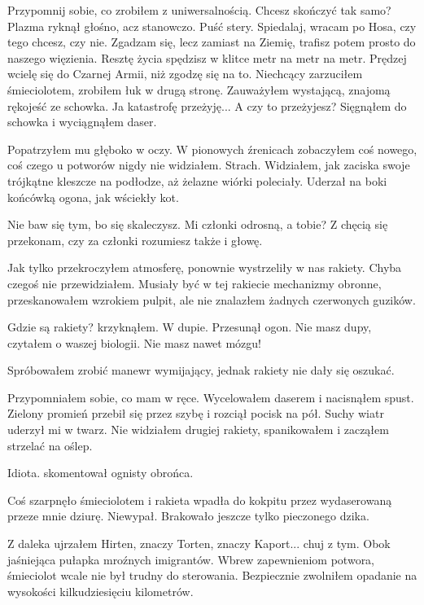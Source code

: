 \begin{dialogue}
\ds{} Przypomnij sobie, co zrobiłem z uniwersalnością. Chcesz skończyć tak samo? \dm{} Plazma ryknął głośno, acz stanowczo. \dm{} Puść stery.
\ds{} Spiedalaj, wracam po Hosa, czy tego chcesz, czy nie.
\ds{} Zgadzam się, lecz zamiast na Ziemię, trafisz potem prosto do naszego więzienia. Resztę życia spędzisz w klitce metr na metr na metr.
\ds{} Prędzej wcielę się do Czarnej Armii, niż zgodzę się na to. \dm{} Niechcący zarzuciłem śmieciolotem, zrobiłem łuk w drugą stronę. Zauważyłem wystającą, znajomą rękojeść ze schowka.
\ds{} Ja katastrofę przeżyję...
\ds{} A czy to przeżyjesz? \dm{} Sięgnąłem do schowka i wyciągnąłem daser. 
\end{dialogue}
Popatrzyłem mu głęboko w oczy. W pionowych źrenicach zobaczyłem coś nowego, coś czego u potworów nigdy nie widziałem. Strach.
Widziałem, jak zaciska swoje trójkątne kleszcze na podłodze, aż żelazne wiórki poleciały.
Uderzał na boki końcówką ogona, jak wściekły kot.

\begin{dialogue}
\ds{} Nie baw się tym, bo się skaleczysz. Mi członki odrosną, a tobie?
\ds{} Z chęcią się przekonam, czy za członki rozumiesz także i głowę.
\end{dialogue}

Jak tylko przekroczyłem atmosferę, ponownie wystrzeliły w nas rakiety.
Chyba czegoś nie przewidziałem.
Musiały być w tej rakiecie mechanizmy obronne, przeskanowałem wzrokiem pulpit, ale nie znalazłem żadnych czerwonych guzików.
\begin{dialogue}
\ds{} Gdzie są rakiety? \dm{} krzyknąłem.
\ds{} W dupie. \dm{} Przesunął ogon.
\ds{} Nie masz dupy, czytałem o waszej biologii. Nie masz nawet mózgu!
\end{dialogue}
Spróbowałem zrobić manewr wymijający, jednak rakiety nie dały się oszukać.

Przypomniałem sobie, co mam w ręce.
Wycelowałem daserem i nacisnąłem spust.
Zielony promień przebił się przez szybę i rozciął pocisk na pół.
Suchy wiatr uderzył mi w twarz.
Nie widziałem drugiej rakiety, spanikowałem i zacząłem strzelać na oślep.
\begin{dialogue}
\ds{} Idiota. \dm{} skomentował ognisty obrońca.
\end{dialogue}

Coś szarpnęło śmieciolotem i rakieta wpadła do kokpitu przez wydaserowaną przeze mnie dziurę. Niewypał.
Brakowało jeszcze tylko pieczonego dzika.

Z daleka ujrzałem Hirten, znaczy Torten, znaczy Kaport... chuj z tym.
Obok jaśniejąca pułapka mroźnych imigrantów.
Wbrew zapewnieniom potwora, śmieciolot wcale nie był trudny do sterowania.
Bezpiecznie zwolniłem opadanie na wysokości kilkudziesięciu kilometrów.

